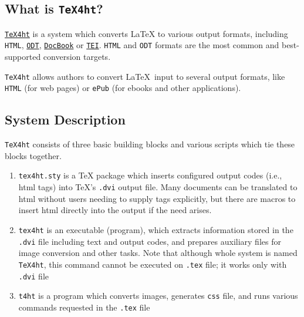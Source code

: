 \hypertarget{what-is-tex4ht}{%
\subsection{\texorpdfstring{What is
\texttt{TeX4ht}?}{What is TeX4ht?}}\label{what-is-tex4ht}}

\href{https://www.tug.org/tex4ht/}{\texttt{TeX4ht}} is a system which
converts LaTeX to various output formats, including \texttt{HTML},
\href{http://en.wikipedia.org/wiki/OpenDocument}{\texttt{ODT}},
\href{http://en.wikipedia.org/wiki/DocBook}{\texttt{DocBook}} or
\href{http://en.wikipedia.org/wiki/Text_Encoding_Initiative}{\texttt{TEI}}.
\texttt{HTML} and \texttt{ODT} formats are the most common and best-supported
conversion targets.

\texttt{TeX4ht} allows authors to convert \LaTeX\ input to 
several output formats, like  \texttt{HTML} (for web pages) or
\texttt{ePub} (for ebooks and other applications).

\hypertarget{system-description}{%
\subsection{System Description}\label{system-description}}

\texttt{TeX4ht} consists of three basic building blocks and various
scripts which tie these blocks together.

\begin{enumerate}
\def\labelenumi{\arabic{enumi}.}
\item
  \texttt{tex4ht.sty} is a TeX package which inserts configured output
  codes (i.e., html tags) into TeX's \texttt{.dvi} output file. Many
  documents can be translated to html without users needing to supply
  tags explicitly, but there are macros to insert html directly into the
  output if the need arises.
\item
  \texttt{tex4ht} is an executable (program), which extracts information
  stored in the \texttt{.dvi} file including text and output codes, and
  prepares auxiliary files for image conversion and other tasks. Note
  that although whole system is named \texttt{TeX4ht}, this command
  cannot be executed on \texttt{.tex} file; it works only with
  \texttt{.dvi} file
\item
  \texttt{t4ht} is a program which converts images, generates
  \texttt{css} file, and runs various commands requested in the
  \texttt{.tex} file
\end{enumerate}

